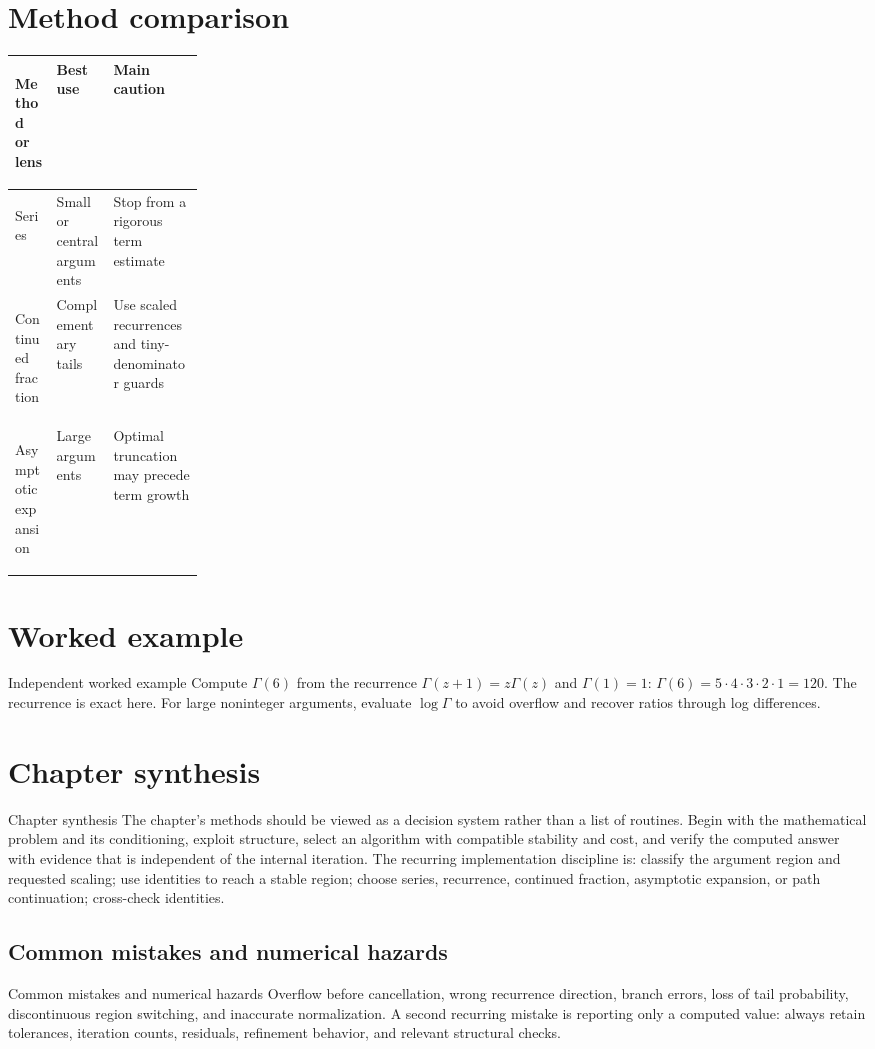 \documentclass[10pt,letterpaper]{article}
\begin{document}
\section*{Method comparison}
\begin{center}
\small
\begin{tabularx}{\linewidth}{>{\bfseries\raggedright\arraybackslash}p{0.22\linewidth}XX}
\toprule
Method or lens & Best use & Main caution \\
\midrule
Series & Small or central arguments & Stop from a rigorous term estimate \\
Continued fraction & Complementary tails & Use scaled recurrences and tiny-denominator guards \\
Asymptotic expansion & Large arguments & Optimal truncation may precede term growth \\
\bottomrule
\end{tabularx}
\end{center}

\section*{Worked example}
\begin{exambox}{Independent worked example}
Compute $\Gamma(6)$ from the recurrence $\Gamma(z+1)=z\Gamma(z)$ and $\Gamma(1)=1$: $\Gamma(6)=5\cdot4\cdot3\cdot2\cdot1=120$.  The recurrence is exact here.  For large noninteger arguments, evaluate $\log\Gamma$ to avoid overflow and recover ratios through log differences.
\end{exambox}

\section*{Chapter synthesis}
\begin{summarybox}{Chapter synthesis}
The chapter's methods should be viewed as a decision system rather than a list of routines.  Begin with the mathematical problem and its conditioning, exploit structure, select an algorithm with compatible stability and cost, and verify the computed answer with evidence that is independent of the internal iteration.  The recurring implementation discipline is: classify the argument region and requested scaling; use identities to reach a stable region; choose series, recurrence, continued fraction, asymptotic expansion, or path continuation; cross-check identities.
\end{summarybox}

\subsection*{Common mistakes and numerical hazards}
\begin{warnbox}{Common mistakes and numerical hazards}
Overflow before cancellation, wrong recurrence direction, branch errors, loss of tail probability, discontinuous region switching, and inaccurate normalization.  A second recurring mistake is reporting only a computed value: always retain tolerances, iteration counts, residuals, refinement behavior, and relevant structural checks.
\end{warnbox}
\end{document}
